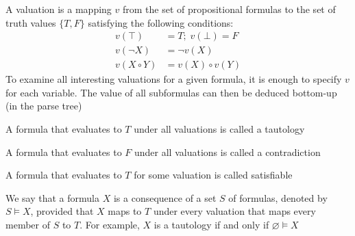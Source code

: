 \documentclass[a4paper]{article}
\theoremstyle{plain}
\theoremstyle{definition}
\newtheorem{defn}{Definition}[section]
\theoremstyle{remark}
\begin{document}
\begin{tcolorbox}[colback=black!3!white,colframe=black!60!white,title=\begin{defn}Valuation \label{Valuation}\end{defn}]
A valuation is a mapping $v$ from the set of propositional formulas to the set of truth values $\{T,F\}$ satisfying the following conditions:
\begin{align}
	v(\top) &= T; \; v(\bot) = F \\
	v(\neg X)  &= \neg v(X) \\
	v(X \circ Y) &= v(X) \circ v(Y)
\end{align}
To examine all interesting valuations for a given formula, it is enough to specify $v$ for each variable. The value of all subformulas can then be deduced bottom-up (in the parse tree)
\end{tcolorbox}
\begin{tcolorbox}[colback=black!3!white,colframe=black!60!white,title=\begin{defn}Tautology \label{Tautology}\end{defn}]
A formula that evaluates to $T$ under all valuations is called a tautology
\end{tcolorbox}
\begin{tcolorbox}[colback=black!3!white,colframe=black!60!white,title=\begin{defn}Contradiction \label{Contradiction}\end{defn}]
A formula that evaluates to $F$ under all valuations is called a contradiction
\end{tcolorbox}
\begin{tcolorbox}[colback=black!3!white,colframe=black!60!white,title=\begin{defn}Satisfiable \label{Satisfiable}\end{defn}]
A formula that evaluates to $T$ for some valuation is called satisfiable
\end{tcolorbox}
 \begin{tcolorbox}[colback=black!3!white,colframe=black!60!white,title=\begin{defn}Propositional Consequence \label{Propositional Consequence}\end{defn}]
 We say that a formula $X$ is a consequence of a set $S$ of formulas, denoted by $S\vDash X$, provided that $X$ maps to $T$ under every valuation that maps every member of $S$ to $T$. For example, $X$ is a tautology if and only if $\varnothing \vDash X$ 
 \end{tcolorbox}
\end{document}
